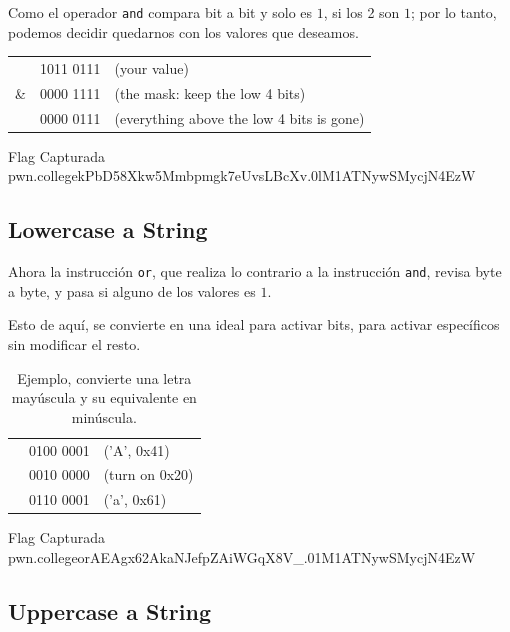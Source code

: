 Como el operador \texttt{and} compara bit a bit y solo es \( 1 \), si los 2 son \( 1 \);
por lo tanto, podemos decidir quedarnos con los valores que deseamos.

\begin{center}
	\begin{tabular}{lcl}
		   & 1011 0111 & (your value)                              \\
		\& & 0000 1111 & (the mask: keep the low 4 bits)           \\
		\midrule
		   & 0000 0111 & (everything above the low 4 bits is gone)
	\end{tabular}
\end{center}

\begin{flagbox}{Flag Capturada}
	pwn.college{kPbD58Xkw5Mmbpmgk7eUvsLBcXv.0lM1ATNywSMycjN4EzW}
\end{flagbox}

\subsection{Lowercase a String}\label{subsec:lowercase_a_string}

Ahora la instrucción \texttt{or}, que realiza lo contrario a la instrucción
\texttt{and}, revisa byte a byte, y pasa si alguno de los valores es \( 1 \).

Esto de aquí, se convierte en una ideal para activar bits, para activar
específicos sin modificar el resto.

\begin{table}[htbp]
	\begin{center}
		\begin{tabular}{lcl}
			         & 0100 0001 & ('A', 0x41)    \\
			\textbar & 0010 0000 & (turn on 0x20) \\
			\midrule
			         & 0110 0001 & ('a', 0x61)
		\end{tabular}
	\end{center}
	\caption{Ejemplo, convierte una letra mayúscula y su equivalente en minúscula.}\label{tab:convert_lowercase_to_upper_case}
\end{table}

\begin{flagbox}{Flag Capturada}
	pwn.college{orAEAgx62AkaNJefpZAiWGqX8V_.01M1ATNywSMycjN4EzW}
\end{flagbox}

\subsection{Uppercase a String}\label{subsec:uppercase_a_string}

